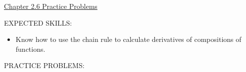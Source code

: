 \documentclass[12pt]{article}
\begin{document}
\begin{center}
\underline{\LARGE{Chapter 2.6 Practice Problems}}
\end{center}

\noindent EXPECTED SKILLS:

\begin{itemize}

\item Know how to use the chain rule to calculate derivatives of compositions of functions.

\end{itemize}

\noindent PRACTICE PROBLEMS:

\medskip

\end{document}
